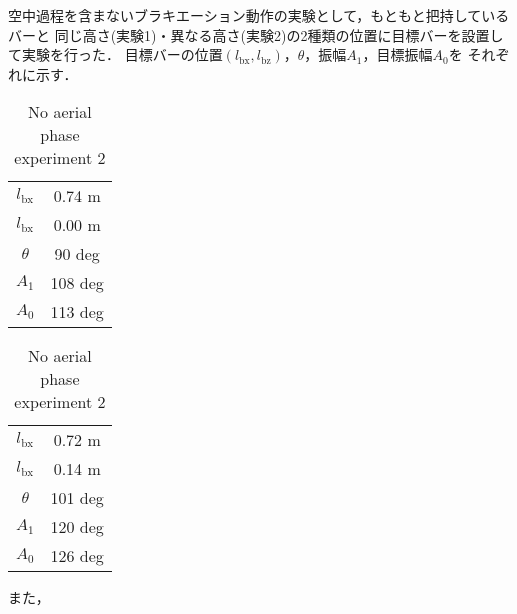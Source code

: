         空中過程を含まないブラキエーション動作の実験として，もともと把持しているバーと
        同じ高さ(実験1)・異なる高さ(実験2)の2種類の位置に目標バーを設置して実験を行った．
        目標バーの位置$(l_{\mathrm{bx}},l_{\mathrm{bz}})$，$\theta$，振幅$A_1$，目標振幅$A_0$を
        それぞれに示す．
        \begin{table}[t]
                \begin{minipage}[c]{0.5\hsize}
                  \centering
                  \caption{No aerial phase experiment 1}
                  \vspace{2mm}
                  \begin{tabular}{c|c}
                    \hline
                    $l_{\mathrm{bx}}$ & 0.74 m \\
                    $l_{\mathrm{bx}}$ & 0.00 m \\
                    $\theta$ & 90 deg \\ 
                    $A_1$ & 108 deg \\
                    $A_0$ & 113 deg \\
                    \hline
                  \end{tabular}
                \end{minipage}
                \begin{minipage}[c]{0.5\hsize}
                  \centering
                  \caption{No aerial phase experiment 2}
                  \vspace{2mm}
                  \begin{tabular}{c|c}
                    \hline
                    $l_{\mathrm{bx}}$ & 0.72 m \\
                    $l_{\mathrm{bx}}$ & 0.14 m \\
                    $\theta$ & 101 deg \\ 
                    $A_1$ & 120 deg \\
                    $A_0$ & 126 deg \\
                    \hline
                  \end{tabular}
                \end{minipage}
              \end{table}
        また，
